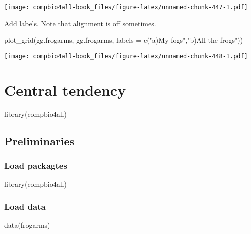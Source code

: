 \documentclass[
]{book}
\newenvironment{Shaded}{\begin{snugshade}}{\end{snugshade}}
\newcommand{\AttributeTok}[1]{\textcolor[rgb]{0.77,0.63,0.00}{#1}}
\newcommand{\FunctionTok}[1]{\textcolor[rgb]{0.00,0.00,0.00}{#1}}
\newcommand{\NormalTok}[1]{#1}
\newcommand{\StringTok}[1]{\textcolor[rgb]{0.31,0.60,0.02}{#1}}
\begin{document}
\texttt{[image: compbio4all-book\_files/figure-latex/unnamed-chunk-447-1.pdf]}

Add labels. Note that alignment is off sometimes.

\begin{Shaded}
\begin{Highlighting}[]
\FunctionTok{plot\_grid}\NormalTok{(gg.frogarms, }
\NormalTok{          gg.frogarms,}
          \AttributeTok{labels =} \FunctionTok{c}\NormalTok{(}\StringTok{"a)My fogs"}\NormalTok{,}\StringTok{"b)All the frogs"}\NormalTok{))}
\end{Highlighting}
\end{Shaded}

\texttt{[image: compbio4all-book\_files/figure-latex/unnamed-chunk-448-1.pdf]}

\hypertarget{central-tendency}{%
\chapter{Central tendency}\label{central-tendency}}

\begin{Shaded}
\begin{Highlighting}[]
\FunctionTok{library}\NormalTok{(compbio4all)}
\end{Highlighting}
\end{Shaded}

\hypertarget{preliminaries-9}{%
\section{Preliminaries}\label{preliminaries-9}}

\hypertarget{load-packagtes-1}{%
\subsection{Load packagtes}\label{load-packagtes-1}}

\begin{Shaded}
\begin{Highlighting}[]
\FunctionTok{library}\NormalTok{(compbio4all)}
\end{Highlighting}
\end{Shaded}

\hypertarget{load-data-2}{%
\subsection{Load data}\label{load-data-2}}

\begin{Shaded}
\begin{Highlighting}[]
\FunctionTok{data}\NormalTok{(frogarms)}
\end{Highlighting}
\end{Shaded}
\end{document}
